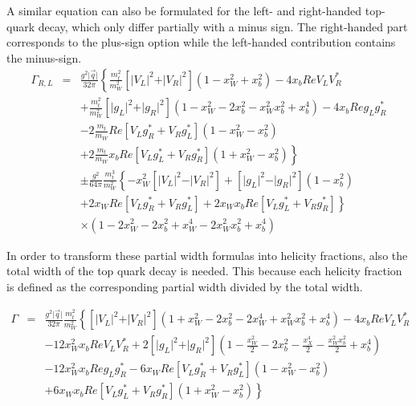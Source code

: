 A similar equation can also be formulated for the left- and right-handed top-quark decay, which only differ partially with a minus sign. The right-handed part corresponds to the plus-sign option while the left-handed contribution contains the minus-sign.
\begin{eqnarray}
 \Gamma_{R,L} & = & \frac{g^{2} \vert \vec{q} \vert}{32 \pi} \left\lbrace \frac{m_{t}^{2}}{m_{W}^{2}} \left[ \vert V_{L} \vert^{2} + \vert V_{R} \vert^{2} \right] (1 - x_{W}^{2} + x_{b}^{2}) - 4x_{b}Re V_{L}V_{R}^{*} \right. \nonumber \\
            &   & + \frac{m_{t}^{2}}{m_{W}^{2}} \left[ \vert g_{L} \vert^{2} + \vert g_{R} \vert^{2} \right] (1 - x_{W}^{2} - 2x_{b}^{2} -x_{W}^{2} x_{b}^{2} + x_{b}^{4}) - 4x_{b}Re g_{L}g_{R}^{*} \nonumber \\
            &   & - 2 \frac{m_t}{m_W} Re \left[ V_{L}g_{R}^{*} + V_{R}g_{L}^{*} \right] (1- x_{W}^{2} - x_{b}^{2}) \nonumber \\
            &   &  \left. + 2 \frac{m_t}{m_W} x_b Re \left[ V_{L}g_{L}^{*} + V_{R}g_{R}^{*} \right] (1+ x_{W}^{2} - x_{b}^{2}) \right\rbrace \nonumber \\
           &   & \pm \frac{g^{2}}{64 \pi} \frac{m_{t}^{3}}{m_{W}^{2}} \left\lbrace -x_{W}^{2} \left[ \vert V_{L} \vert^{2} - \vert V_{R} \vert^{2} \right] + \left[ \vert g_{L} \vert^{2} - \vert g_{R} \vert^{2} \right] (1-x_{b}^{2}) \right. \nonumber \\
            &   &  \left. + 2 x_{W} Re \left[ V_{L}g_{R}^{*} + V_{R}g_{L}^{*} \right] + 2x_{W} x_{b} Re \left[ V_{L}g_{L}^{*} + V_{R}g_{R}^{*} \right] \right\rbrace \nonumber \\
            &   & \times (1-2x_{W}^{2} - 2x_{b}^{2} + x_{W}^{4} - 2x_{W}^{2} x_{b}^{2} + x_{b}^{4})
\end{eqnarray}

In order to transform these partial width formulas into helicity fractions, also the total width of the top quark decay is needed. This because each helicity fraction is defined as the corresponding partial width divided by the total width.

\begin{eqnarray}
 \Gamma & = & \frac{g^{2} \vert \vec{q} \vert}{32 \pi} \frac{m_{t}^{2}}{m_{W}^{2}} \left\lbrace \left[ \vert V_{L} \vert^{2} + \vert V_{R} \vert^{2} \right] (1 + x_{W}^{2} - 2x_{b}^{2} - 2 x_{W}^{4} + x_{W}^{2} x_{b}^{2} + x_{b}^{4}) - 4x_{b}Re V_{L}V_{R}^{*} \right. \nonumber \\
        &   & -12 x_{W}^{2} x_{b} Re V_{L} V_{R}^{*} + 2 \left[ \vert g_{L} \vert^{2} + \vert g_{R} \vert^{2} \right] \left( 1 - \frac{x_{W}^{2}}{2} - 2 x_{b}^{2} - \frac{x_{X}^{4}}{2} - \frac{x_{W}^{2} x_{b}^{2}}{2} +x_{b}^{4} \right) \nonumber \\
        &   & -12 x_{W}^{2} x_{b} Re g_{L} g_{R}^{*} - 6 x_{W} Re \left[ V_{L}g_{R}^{*} + V_{R}g_{L}^{*} \right] (1 - x_{W}^{2} - x_{b}^{2}) \nonumber \\
        &   & \left. + 6 x_{W} x_{b} Re \left[ V_{L}g_{L}^{*} + V_{R}g_{R}^{*} \right] (1 + x_{W}^{2} - x_{b}^{2}) \right\rbrace
\end{eqnarray}

